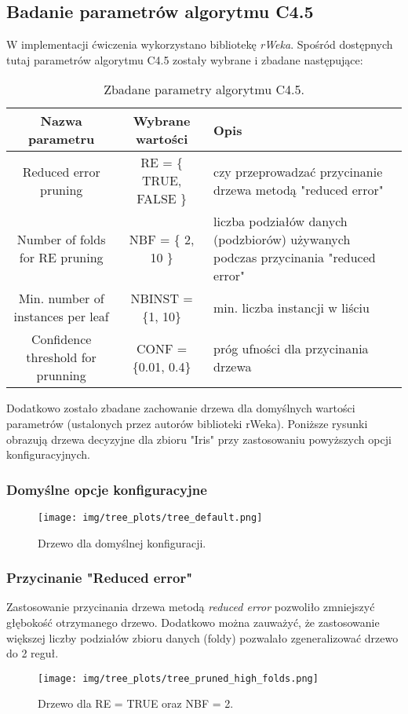 \subsection{Badanie parametrów algorytmu C4.5}
  W implementacji ćwiczenia wykorzystano bibliotekę \textit{rWeka}. Spośród dostępnych
  tutaj parametrów algorytmu C4.5 zostały wybrane i zbadane następujące:

  \begin{table}[H]
    \begin{tabular}{|c|c|p{6cm}|}
      \hline
      \textbf{Nazwa parametru} & \textbf{Wybrane wartości} & \textbf{Opis} \\ \hline
      Reduced error pruning    &  RE = \{ TRUE, FALSE \}   & czy przeprowadzać przycinanie drzewa metodą "reduced error" \\ \hline
      Number of folds for RE pruning & NBF = \{ 2, 10 \}   & liczba podziałów danych (podzbiorów) używanych podczas przycinania "reduced error" \\ \hline
      Min. number of instances per leaf & NBINST = \{1, 10\}& min. liczba instancji w liściu \\ \hline
      Confidence threshold for prunning & CONF = \{0.01, 0.4\}& próg ufności dla przycinania drzewa \\ \hline
    \end{tabular}
    \caption{Zbadane parametry algorytmu C4.5.}
  \end{table}
  Dodatkowo zostało zbadane zachowanie drzewa dla domyślnych wartości parametrów (ustalonych przez autorów biblioteki rWeka).
  Poniższe rysunki obrazują drzewa decyzyjne dla zbioru "Iris" przy zastosowaniu powyższych opcji konfiguracyjnych.

  \subsubsection*{Domyślne opcje konfiguracyjne}
  \begin{figure}[H]
    \center
    \texttt{[image: img/tree\_plots/tree\_default.png]}
    \caption{Drzewo dla domyślnej konfiguracji.}
  \end{figure}

  \subsubsection*{Przycinanie "Reduced error"}
  Zastosowanie przycinania drzewa metodą \textit{reduced error} pozwoliło zmniejszyć głębokość
  otrzymanego drzewo. Dodatkowo można zauważyć, że zastosowanie większej liczby podziałów zbioru 
  danych (foldy) pozwalało zgeneralizować drzewo do 2 reguł. 
  \begin{figure}[H]
    \center
    \texttt{[image: img/tree\_plots/tree\_pruned\_high\_folds.png]}
    \caption{Drzewo dla RE = TRUE oraz NBF = 2.}
  \end{figure}

